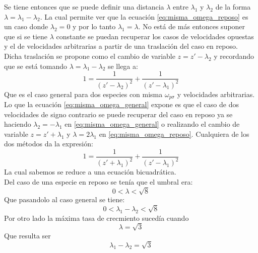 \documentclass[../tesis_main_file.tex]{subfiles}
\begin{document}
Se tiene entonces que se puede definir una distancia $\lambda$ entre $\lambda_1$ y $\lambda_2$ de la forma $\lambda = \lambda_1 - \lambda_2$. La cual permite ver que la ecuación \ref{eq:misma_omega_reposo} es un caso donde $\lambda_2 =0$ y por lo tanto $\lambda_1 = \lambda$. No está de más entonces suponer que si se tiene $\lambda$ constante se puedan recuperar los casos de velocidades opuestas y el de velocidades arbitrarias a partir de una traslación del caso en reposo.\\
Dicha traslación se propone como el cambio de variable $z=z'-\lambda_2$ y recordando que se está tomando $\lambda= \lambda_1 - \lambda_2$ se llega a:
\begin{equation}
\label{eq:misma_omega_general}
1 = \frac{1}{(z'-\lambda_2)^2} + \frac{1}{(z'-\lambda_1)^2}
\end{equation}
Que es el caso general para dos especies con misma $\omega_{p\sigma}$ y velocidades arbitrarias. Lo que la ecuación \ref{eq:misma_omega_general} expone es que el caso de dos velocidades de signo contrario se puede recuperar del caso en reposo ya se haciendo $\lambda_2 = -\lambda_1$ en \ref{eq:misma_omega_general} o realizando el cambio de variable $z=z' +\lambda_1$ y $\lambda= 2\lambda_1$ en \ref{eq:misma_omega_reposo}. Cualquiera de los dos métodos da la expresión:
\begin{equation}
\label{eq:misma_omega_opuestas_cambio}
1 = \frac{1}{(z'+\lambda_1)^2} + \frac{1}{(z'-\lambda_1)^2}
\end{equation}
La cual sabemos se reduce a una ecuación bicuadrática.\\
Del caso de una especie en reposo se tenía que el umbral era:
\begin{equation}
0<\lambda<\sqrt{8}
\end{equation}
Que pasandolo al caso general se tiene:
\begin{equation}
0<\lambda_1 - \lambda_2 <\sqrt{8}
\end{equation}
Por otro lado la máxima tasa de crecmiento sucedía cuando
\begin{equation}
\lambda=\sqrt{3}
\end{equation}
Que resulta ser 
\begin{equation}
\lambda_1 - \lambda_2 = \sqrt{3}
\end{equation}
%
\end{document}
